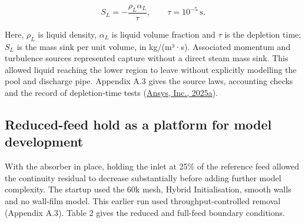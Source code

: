 \documentclass[12pt]{article}
\begin{document}
\[
S_L=-\frac{\rho_L\alpha_L}{\tau},\qquad \tau=10^{-5}\ \mathrm{s}.
\]

Here, \(\rho_L\) is liquid density, \(\alpha_L\) is liquid volume fraction and \(\tau\) is the depletion time; \(S_L\) is the mass sink per unit volume, in kg/(m³·s). Associated momentum and turbulence sources represented capture without a direct steam mass sink. This allowed liquid reaching the lower region to leave without explicitly modelling the pool and discharge pipe. Appendix A.3 gives the source laws, accounting checks and the record of depletion-time tests (\href{https://ansyshelp.ansys.com/public/Views/Secured/corp/v252/en/flu_ug/flu_ug_bcs_sec_cell_zones.html}{Ansys, Inc., 2025a}).

\subsection{Reduced-feed hold as a platform for model development}\label{reduced-feed-hold-as-a-platform-for-model-development}

With the absorber in place, holding the inlet at 25\% of the reference feed allowed the continuity residual to decrease substantially before adding further model complexity. The startup used the 60k mesh, Hybrid Initialisation, smooth walls and no wall-film model. This earlier run used throughput-controlled removal (Appendix A.3). Table 2 gives the reduced and full-feed boundary conditions.
\end{document}
